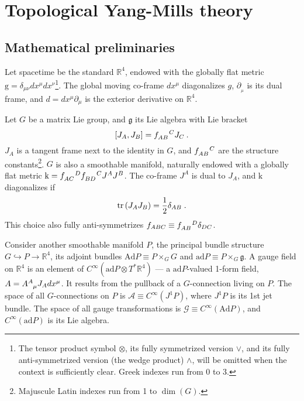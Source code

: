\documentclass[../main/tex]{subfiles}
\begin{document}
\section{Topological Yang-Mills theory}\label{sec:tym}

\subsection{Mathematical preliminaries}\label{ssec:math-preliminaries;sec:tym}

Let spacetime be the standard $\mathbb{R}^4$, endowed with the globally flat metric $ \mathrm{g} =\delta_{\mu\nu}dx^\mu dx^\nu$\footnote{The tensor product symbol $\otimes$, its fully symmetrized version $\vee$, and its fully anti-symmetrized version (the wedge product) $\wedge$, will be omitted when the context is sufficiently clear. Greek indexes run from 0 to 3.}. The global moving co-frame $dx^\mu$ diagonalizes $ g $, $ \partial_{ _\mu } $ is its dual frame, and $d=dx^{\mu}\partial_{ \mu }$ is the exterior derivative on $\mathbb{R}^4$.

Let $G$ be a matrix Lie group, and $\mathfrak{g}$ its Lie algebra with Lie bracket
\begin{equation}
  \label{eq:G lie algebra}
  \left[ J_{A}, J_{B} \right]=\tensor{f}{_{AB}^C}J_C \:.
\end{equation}
$J_A$ is a tangent frame next to the identity in $G$, and $\tensor{f}{_{AB}^C}$ are the structure constants\footnote{Majuscule Latin indexes run from 1 to $\dim\left(G\right)$.}. $G$ is also a smoothable manifold, naturally endowed with a globally flat metric $ \mathrm{k} = \tensor{ f }{ _{AC}^D } \tensor{ f }{ _{BD}^C } J^A J^B $. The co-frame $ J^A $ is dual to $J_A$, and $ \mathrm{k} $ diagonalizes if
\begin{equation}
  \label{eq:orthonormal generators}
  \operatorname{tr}\left(J_A J_B\right) = \frac{1}{2}\delta_{AB} \;.
\end{equation}
This choice also fully anti-symmetrizes $f_{ABC}\equiv \tensor{f}{_{AB}^D}\delta_{DC}$.

Consider another smoothable manifold $ P $, the principal bundle structure $G \hookrightarrow P \rightarrow \mathbb{R}^4$, its adjoint bundles $ \mathrm{Ad} P \equiv P \times_G G $ and $ \mathrm{ad}P \equiv P \times_G \mathfrak{g}$. A gauge field on $ \mathbb{R}^4 $ is an element of $C^\infty \left( \mathrm{ad}P \otimes T^*\mathbb{R}^4 \right)$ --- a $ \mathrm{ad} P $-valued 1-form field, $ A=\tensor{A}{ ^A_\mu }J_A dx^\mu $. It results from the pullback of a $G$-connection living on $ P $. The space of all $G$-connections on $ P $ is $ \mathcal{A} \equiv C^{ \infty } \left( J^1 P \right) $, where $ J^1 P $ is its 1st jet bundle. The space of all gauge transformations is $ \mathcal{G} \equiv C^{ \infty }\left( \mathrm{Ad}P \right) $, and $ C^{ \infty } \left( \mathrm{ad} P \right) $ is its Lie algebra.
\end{document}
